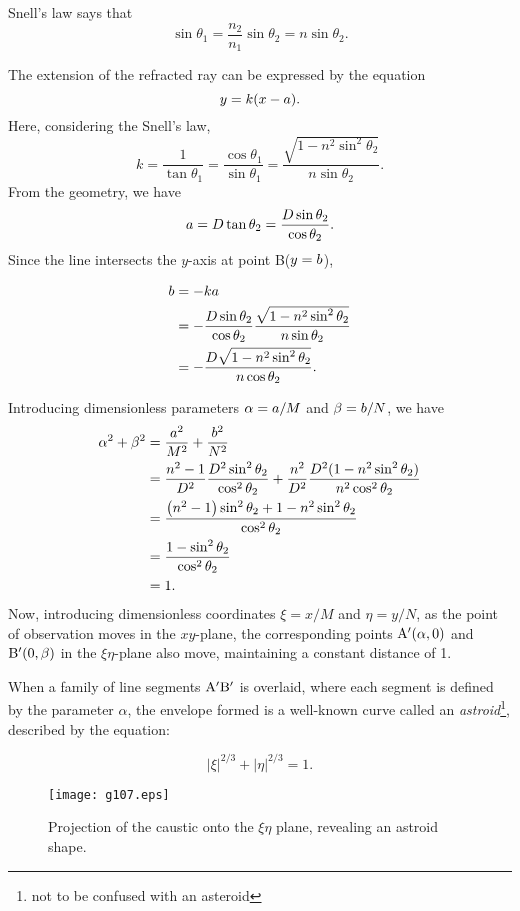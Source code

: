 \documentclass[twocolumn]{article}
\begin{document}
Snell's law says that
$$ \sin\theta_1 = \frac{n_2}{n_1} \sin\theta_2 = n\sin\theta_2.$$

The extension of the refracted ray can be expressed by the equation
$$y=k(x-{a}).$$
Here, considering the Snell's law,
$$k=\dfrac{1}{\tan\theta_1}=\dfrac{\cos\theta_1}{\sin\theta_1}
=\dfrac{\sqrt{1-n^2\sin^2\theta_2}}{n\sin\theta_2}.$$
From the geometry, we have
$${a} = D\tan\theta_2 = \dfrac{D\sin\theta_2}{\cos\theta_2}.$$
Since the line intersects the $y$-axis at point B($y={b}$),

$$\begin{aligned}
	{b} &= -k{a} \\
	&= -\dfrac{D\sin\theta_2}{\cos\theta_2}
	\dfrac{\sqrt{1-n^2\sin^2\theta_2}}{n\sin\theta_2}\\
	&=-\dfrac{D\sqrt{1-n^2\sin^2\theta_2}}{n\cos\theta_2}.
\end{aligned}$$

Introducing dimensionless parameters ${\alpha}={a}/M$ and ${\beta}={b}/N$, we have
$$ \begin{aligned}
	\greeka^2 + \greekb^2 &= \dfrac{\romana^2}{M^2}+\dfrac{\romanb^2}{N^2}\\
	&=\dfrac{n^2-1}{D^2}\dfrac{D^2\sin^2\theta_2}{\cos^2\theta_2}%
	+\dfrac{n^2}{D^2}\dfrac{D^2(1-n^2\sin^2\theta_2)}{n^2\cos^2\theta_2}\\
	&=\dfrac{\left(n^2-1\right)\sin^2\theta_2 + 1-n^2\sin^2\theta_2}
	{\cos^2\theta_2}\\
	&=\dfrac{1-\sin^2\theta_2}{\cos^2\theta_2}\\
	&= 1.
\end{aligned}$$
Now, introducing dimensionless coordinates $\xi=x/M$ and $\eta=y/N$, as the point of observation moves in the $xy$-plane, the corresponding points $\mathrm{{A^{\prime}}}(\alpha, 0)$ and $\mathrm{{B^{\prime}}}(0, \beta)$ in the $\xi\eta$-plane also move, maintaining a constant distance of 1. 

When a family of line segments ${\mathrm{{A^{\prime}}{B^{\prime}}}}$ is overlaid, where each segment is defined by the parameter $\alpha$, the envelope formed is a well-known curve called an \emph{astroid}\footnote{not to be confused with an asteroid}, described by the equation:

$$ \left| \xi \right|^{2/3} + \left| \eta \right|^{2/3} = 1. $$

\begin{figure}
	\centering
	\texttt{[image: g107.eps]}	
	\caption{Projection of the caustic onto the $\xi\eta$ plane, revealing an astroid shape.}
	\label{fig:astroid}
\end{figure}
\end{document}
